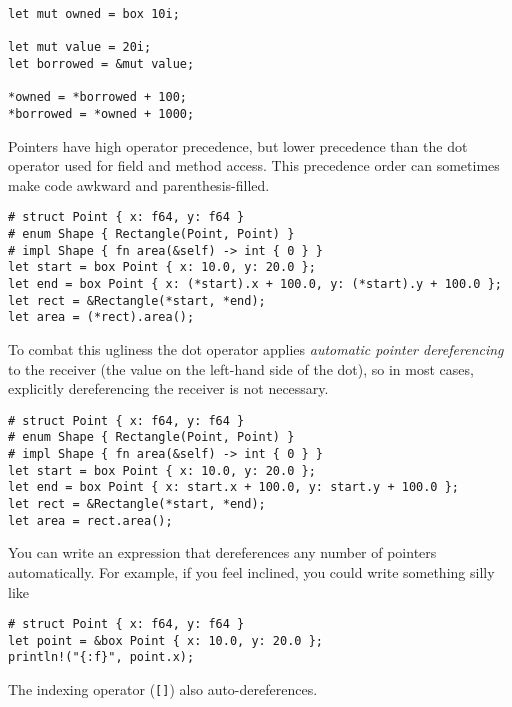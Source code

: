 \documentclass[]{article}
\begin{document}
\begin{verbatim}
let mut owned = box 10i;

let mut value = 20i;
let borrowed = &mut value;

*owned = *borrowed + 100;
*borrowed = *owned + 1000;
\end{verbatim}

Pointers have high operator precedence, but lower precedence than the
dot operator used for field and method access. This precedence order can
sometimes make code awkward and parenthesis-filled.

\begin{verbatim}
# struct Point { x: f64, y: f64 }
# enum Shape { Rectangle(Point, Point) }
# impl Shape { fn area(&self) -> int { 0 } }
let start = box Point { x: 10.0, y: 20.0 };
let end = box Point { x: (*start).x + 100.0, y: (*start).y + 100.0 };
let rect = &Rectangle(*start, *end);
let area = (*rect).area();
\end{verbatim}

To combat this ugliness the dot operator applies \emph{automatic pointer
dereferencing} to the receiver (the value on the left-hand side of the
dot), so in most cases, explicitly dereferencing the receiver is not
necessary.

\begin{verbatim}
# struct Point { x: f64, y: f64 }
# enum Shape { Rectangle(Point, Point) }
# impl Shape { fn area(&self) -> int { 0 } }
let start = box Point { x: 10.0, y: 20.0 };
let end = box Point { x: start.x + 100.0, y: start.y + 100.0 };
let rect = &Rectangle(*start, *end);
let area = rect.area();
\end{verbatim}

You can write an expression that dereferences any number of pointers
automatically. For example, if you feel inclined, you could write
something silly like

\begin{verbatim}
# struct Point { x: f64, y: f64 }
let point = &box Point { x: 10.0, y: 20.0 };
println!("{:f}", point.x);
\end{verbatim}

The indexing operator (\texttt{{[}{]}}) also auto-dereferences.

\end{document}
